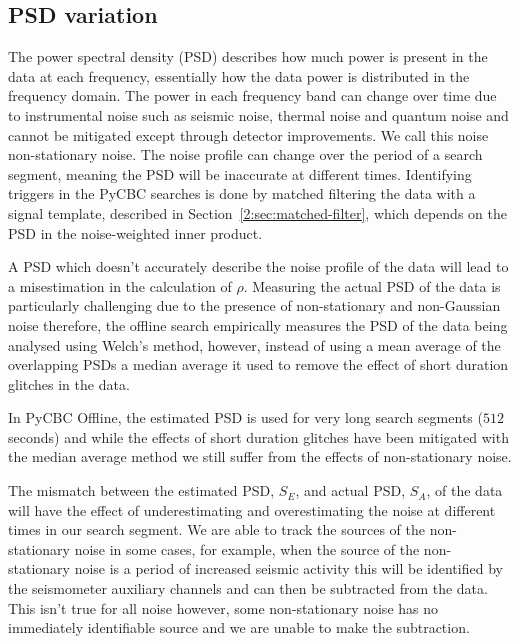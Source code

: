\subsection{\label{5:sec:psd-var}PSD variation}

The power spectral density (PSD) describes how much power is present in the data at each frequency, essentially how the data power is distributed in the frequency domain. The power in each frequency band can change over time due to instrumental noise such as seismic noise, thermal noise and quantum noise and cannot be mitigated except through detector improvements. We call this noise non-stationary noise. The noise profile can change over the period of a search segment, meaning the PSD will be inaccurate at different times. Identifying triggers in the PyCBC searches is done by matched filtering the data with a signal template, described in Section~\ref{2:sec:matched-filter}, which depends on the PSD in the noise-weighted inner product.

A PSD which doesn't accurately describe the noise profile of the data will lead to a misestimation in the calculation of $\rho$. Measuring the actual PSD of the data is particularly challenging due to the presence of non-stationary and non-Gaussian noise therefore, the offline search empirically measures the PSD of the \gwadj data being analysed using Welch's method, however, instead of using a mean average of the overlapping PSDs a median average it used to remove the effect of short duration glitches in the data.

In PyCBC Offline, the estimated PSD is used for very long search segments ($512$ seconds) and while the effects of short duration glitches have been mitigated with the median average method we still suffer from the effects of non-stationary noise. 

The mismatch between the estimated PSD, $S_{E}$, and actual PSD, $S_{A}$, of the data will have the effect of underestimating and overestimating the noise at different times in our search segment. We are able to track the sources of the non-stationary noise in some cases, for example, when the source of the non-stationary noise is a period of increased seismic activity this will be identified by the seismometer auxiliary channels and can then be subtracted from the \gwadj data. This isn't true for all noise however, some non-stationary noise has no immediately identifiable source and we are unable to make the subtraction.

